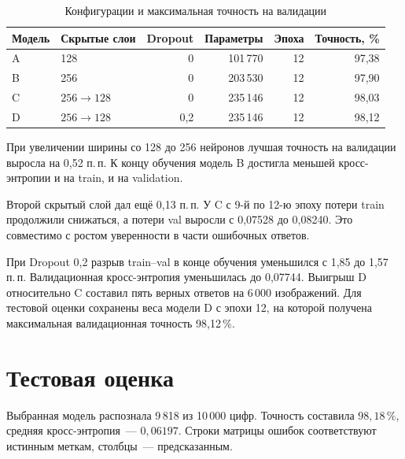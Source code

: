 \begin{table}[!ht]
\centering\small
\caption{Конфигурации и максимальная точность на валидации}
\begin{tabular}{@{}llrrrr@{}}
\toprule
Модель & Скрытые слои & Dropout & Параметры & Эпоха & Точность, \%\\
\midrule
A & 128 & 0 & 101\,770 & 12 & 97,38\\
B & 256 & 0 & 203\,530 & 12 & 97,90\\
C & \(256\to128\) & 0 & 235\,146 & 12 & 98,03\\
D & \(256\to128\) & 0,2 & 235\,146 & 12 & 98,12\\
\bottomrule
\end{tabular}
\end{table}

\clearpage
{}
При увеличении ширины со 128 до 256 нейронов лучшая точность на валидации выросла на 0,52 п.\,п. К концу обучения модель B достигла меньшей кросс-энтропии и на train, и на validation.

\clearpage
{}
Второй скрытый слой дал ещё 0,13 п.\,п. У C с 9-й по 12-ю эпоху потери train продолжили снижаться, а потери val выросли с 0,07528 до 0,08240. Это совместимо с ростом уверенности в части ошибочных ответов.

При Dropout 0,2 разрыв train--val в конце обучения уменьшился с 1,85 до 1,57 п.\,п. Валидационная кросс-энтропия уменьшилась до 0,07744. Выигрыш D относительно C составил пять верных ответов на 6\,000 изображений. Для тестовой оценки сохранены веса модели D с эпохи 12, на которой получена максимальная валидационная точность 98,12\,\%.

\clearpage
\section{Тестовая оценка}
Выбранная модель распознала 9\,818 из 10\,000 цифр. Точность составила \(98{,}18\,\%\), средняя кросс-энтропия~--- \(0{,}06197\). Строки матрицы ошибок соответствуют истинным меткам, столбцы~--- предсказанным.

